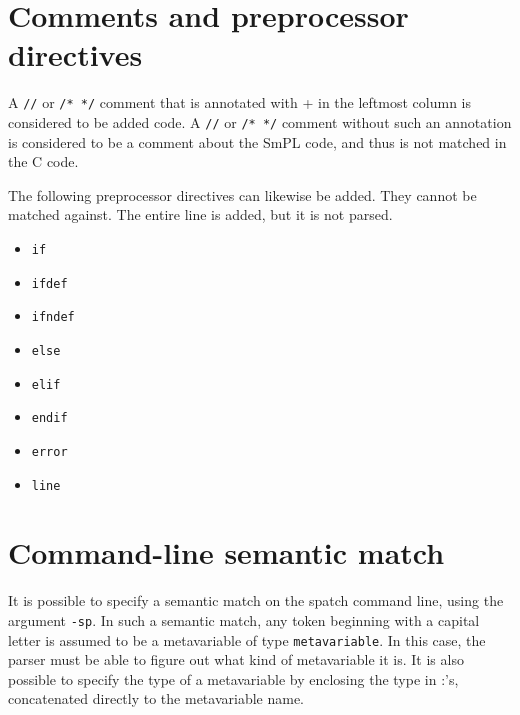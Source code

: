 \begin{grammar}
  \CASE{[0-9]+}
  \CASE{\mth{\cdots}}






\end{grammar}

\section{Comments and preprocessor directives}

A \verb+//+ or \verb+/* */+ comment that is annotated with + in the
leftmost column is considered to be added code.  A \verb+//+ or
\verb+/* */+ comment without such an annotation is considered to be a
comment about the SmPL code, and thus is not matched in the C code.

The following preprocessor directives can likewise be added.  They cannot
be matched against.  The entire line is added, but it is not parsed.

\begin{itemize}
\item \verb+if+
\item \verb+ifdef+
\item \verb+ifndef+
\item \verb+else+
\item \verb+elif+
\item \verb+endif+
\item \verb+error+
\item \verb+line+
\end{itemize}

\section{Command-line semantic match}

It is possible to specify a semantic match on the spatch command line,
using the argument {\tt -sp}.  In such a semantic match, any token
beginning with a capital letter is assumed to be a metavariable of type
{\tt metavariable}.  In this case, the parser must be able to figure out what
kind of metavariable it is.  It is also possible to specify the type of a
metavariable by enclosing the type in :'s, concatenated directly to the
metavariable name.

